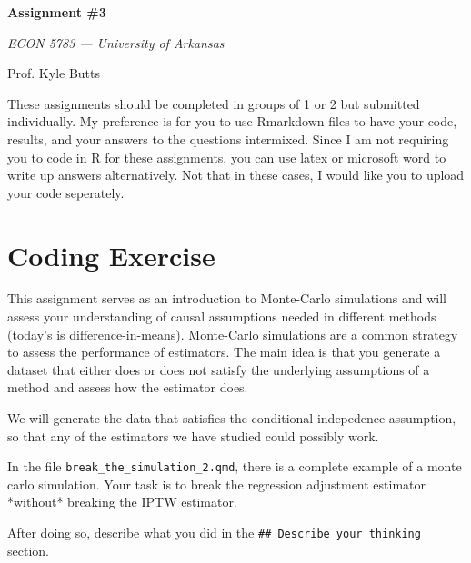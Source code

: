 \documentclass[12pt]{article}
\begin{document}
\begin{center}
  {\Huge\bf Assignment \#3}
  
  \smallskip
  {\large\it  ECON 5783 — University of Arkansas}

  \medskip
  {\large Prof. Kyle Butts}
\end{center}

These assignments should be completed in groups of 1 or 2 but submitted individually. My preference is for you to use Rmarkdown files to have your code, results, and your answers to the questions intermixed. Since I am not requiring you to code in R for these assignments, you can use latex or microsoft word to write up answers alternatively. Not that in these cases, I would like you to upload your code seperately. 

\section*{Coding Exercise}

This assignment serves as an introduction to Monte-Carlo simulations and will assess your understanding of causal assumptions needed in different methods (today's is difference-in-means). Monte-Carlo simulations are a common strategy to assess the performance of estimators. The main idea is that you generate a dataset that either does or does not satisfy the underlying assumptions of a method and assess how the estimator does. 

We will generate the data that satisfies the conditional indepedence assumption, so that any of the estimators we have studied could possibly work. 

In the file \texttt{break\_the\_simulation\_2.qmd}, there is a complete example of a monte carlo simulation. Your task is to break the regression adjustment estimator *without* breaking the IPTW estimator. 


After doing so, describe what you did in the \texttt{\#\# Describe your thinking} section.
\end{document}
